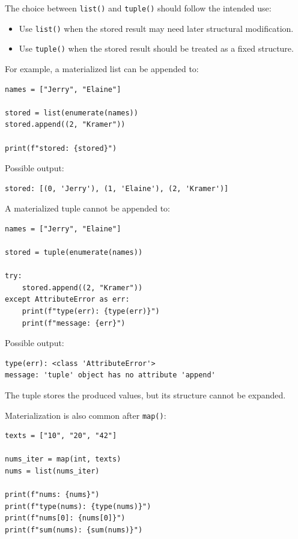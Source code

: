 \documentclass[a4paper,twoside]{report}
\begin{document}
The choice between \texttt{list()} and \texttt{tuple()} should follow the intended use:

\begin{itemize}
    \item Use \texttt{list()} when the stored result may need later structural modification.
    \item Use \texttt{tuple()} when the stored result should be treated as a fixed structure.
\end{itemize}

For example, a materialized list can be appended to:

\begin{verbatim}
names = ["Jerry", "Elaine"]

stored = list(enumerate(names))
stored.append((2, "Kramer"))

print(f"stored: {stored}")
\end{verbatim}

Possible output:

\begin{verbatim}
stored: [(0, 'Jerry'), (1, 'Elaine'), (2, 'Kramer')]
\end{verbatim}

A materialized tuple cannot be appended to:

\begin{verbatim}
names = ["Jerry", "Elaine"]

stored = tuple(enumerate(names))

try:
    stored.append((2, "Kramer"))
except AttributeError as err:
    print(f"type(err): {type(err)}")
    print(f"message: {err}")
\end{verbatim}

Possible output:

\begin{verbatim}
type(err): <class 'AttributeError'>
message: 'tuple' object has no attribute 'append'
\end{verbatim}

The tuple stores the produced values, but its structure cannot be expanded.

Materialization is also common after \texttt{map()}:

\begin{verbatim}
texts = ["10", "20", "42"]

nums_iter = map(int, texts)
nums = list(nums_iter)

print(f"nums: {nums}")
print(f"type(nums): {type(nums)}")
print(f"nums[0]: {nums[0]}")
print(f"sum(nums): {sum(nums)}")
\end{verbatim}
\end{document}
